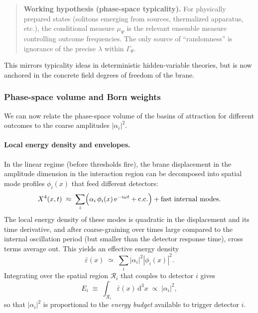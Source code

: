 \begin{quote}
\textbf{Working hypothesis (phase-space typicality).}
For physically prepared states (solitons emerging from sources, thermalized apparatus, etc.), the conditional measure $\mu_\Psi$ is the relevant ensemble measure controlling outcome frequencies.
The only source of ``randomness'' is ignorance of the precise $\lambda$ within $\Gamma_\Psi$.
\end{quote}

This mirrors typicality ideas in deterministic hidden-variable theories, but is now anchored in the concrete field degrees of freedom of the brane.

\subsubsection{Phase-space volume and Born weights}

We can now relate the phase-space volume of the basins of attraction for different outcomes to the coarse amplitudes $|\alpha_i|^2$.

\paragraph{Local energy density and envelopes.}

In the linear regime (before thresholds fire), the brane displacement in the amplitude dimension in the interaction region can be decomposed into spatial mode profiles $\phi_i(x)$ that feed different detectors:
\begin{equation}
  X^4(x,t)
  \;\approx\;
  \sum_i \Bigl( \alpha_i \,\phi_i(x)\, \mathrm{e}^{-i\omega t} + \text{c.c.}\Bigr)
  + \text{fast internal modes}.
\end{equation}
The local energy density of these modes is quadratic in the displacement and its time derivative, and after coarse-graining over times large compared to the internal oscillation period (but smaller than the detector response time), cross terms average out.
This yields an effective energy density
\begin{equation}
  \bar\varepsilon(x) \;\simeq\; \sum_i |\alpha_i|^2 |\phi_i(x)|^2.
\end{equation}
Integrating over the spatial region $\mathcal{R}_i$ that couples to detector $i$ gives
\begin{equation}
  E_i \;\equiv\; \int_{\mathcal{R}_i} \bar\varepsilon(x)\, \mathrm{d}^3x
  \;\propto\; |\alpha_i|^2,
\end{equation}
so that $|\alpha_i|^2$ is proportional to the \emph{energy budget} available to trigger detector $i$.

